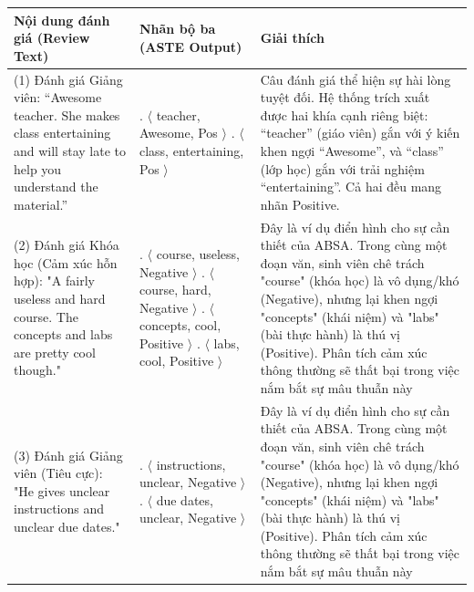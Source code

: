 \documentclass[12pt,a4paper]{report}
\begin{document}
\begin{table}[h!]
\centering
\renewcommand{\arraystretch}{1.3} %
\begin{tabularx}{\textwidth}{ 
    >{\hsize=0.8\hsize}X 
    >{\hsize=0.8\hsize}X 
    >{\hsize=1.4\hsize}X 
}
\toprule
\textbf{Nội dung đánh giá} \newline (Review Text) & \textbf{Nhãn bộ ba} \newline (ASTE Output) & \textbf{Giải thích} \\ 
\midrule

(1) Đánh giá Giảng viên: ``Awesome teacher. She makes class entertaining and will stay late to help you understand the material.'' & 
1. $\langle$ teacher, Awesome, Pos $\rangle$ \newline 
2. $\langle$ class, entertaining, Pos $\rangle$ & 
Câu đánh giá thể hiện sự hài lòng tuyệt đối. Hệ thống trích xuất được hai khía cạnh riêng biệt: ``teacher'' (giáo viên) gắn với ý kiến khen ngợi ``Awesome'', và ``class'' (lớp học) gắn với trải nghiệm ``entertaining''. Cả hai đều mang nhãn Positive. \\ 

\midrule
(2) Đánh giá Khóa học (Cảm xúc hỗn hợp): "A fairly useless and hard course. The concepts and labs are pretty cool though." & 
1. $\langle$ course, useless, Negative $\rangle$ \newline 
2. $\langle$ course, hard, Negative $\rangle$ \newline
3. $\langle$ concepts, cool, Positive $\rangle$ \newline 
4. $\langle$ labs, cool, Positive $\rangle$ \newline
& Đây là ví dụ điển hình cho sự cần thiết của ABSA. Trong cùng một đoạn văn, sinh viên chê trách "course" (khóa học) là vô dụng/khó (Negative), nhưng lại khen ngợi "concepts" (khái niệm) và "labs" (bài thực hành) là thú vị (Positive). Phân tích cảm xúc thông thường sẽ thất bại trong việc nắm bắt sự mâu thuẫn này \\ 

\midrule
(3) Đánh giá Giảng viên (Tiêu cực): "He gives unclear instructions and unclear due dates." & 
1. $\langle$ instructions, unclear, Negative $\rangle$ \newline 
2. $\langle$ due dates, unclear, Negative $\rangle$ \newline
& Đây là ví dụ điển hình cho sự cần thiết của ABSA. Trong cùng một đoạn văn, sinh viên chê trách "course" (khóa học) là vô dụng/khó (Negative), nhưng lại khen ngợi "concepts" (khái niệm) và "labs" (bài thực hành) là thú vị (Positive). Phân tích cảm xúc thông thường sẽ thất bại trong việc nắm bắt sự mâu thuẫn này \\ 


\end{tabularx}
\end{table}
\end{document}

